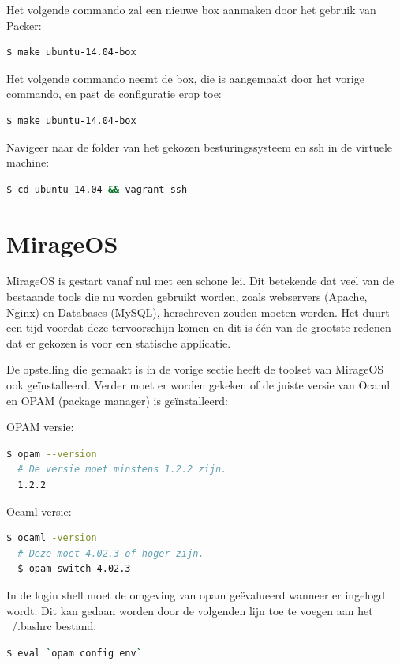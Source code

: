 \documentclass[pdftex,a4paper,12pt,twoside]{report}
\begin{document}
\noindent Het volgende commando zal een nieuwe box aanmaken door het gebruik van Packer:
\begin{lstlisting}[language=bash]
  $ make ubuntu-14.04-box
\end{lstlisting}

\noindent Het volgende commando neemt de box, die is aangemaakt door het vorige commando, en past de configuratie erop toe:
\begin{lstlisting}[language=bash]
  $ make ubuntu-14.04-box
\end{lstlisting}

\noindent Navigeer naar de folder van het gekozen besturingssysteem en ssh in de virtuele machine: 
\begin{lstlisting}[language=bash]
  $ cd ubuntu-14.04 && vagrant ssh
\end{lstlisting}

\section{MirageOS}

MirageOS is gestart vanaf nul met een schone lei. Dit betekende dat veel van de bestaande tools die nu worden gebruikt worden, zoals webservers (Apache, Nginx) en Databases (MySQL), herschreven zouden moeten worden. Het duurt een tijd voordat deze tervoorschijn komen en dit is één van de grootste redenen dat er gekozen is voor een statische applicatie.

De opstelling die gemaakt is in de vorige sectie heeft de toolset van MirageOS ook geïnstalleerd. Verder moet er worden gekeken of de juiste versie van Ocaml en OPAM (package manager) is geïnstalleerd:

\noindent OPAM versie:
\begin{lstlisting}[language=bash]
  $ opam --version
  # De versie moet minstens 1.2.2 zijn.
  1.2.2
\end{lstlisting}

\noindent Ocaml versie:
\begin{lstlisting}[language=bash]
  $ ocaml -version
  # Deze moet 4.02.3 of hoger zijn.
  $ opam switch 4.02.3
\end{lstlisting}

In de login shell moet de omgeving van opam geëvalueerd wanneer er ingelogd wordt. Dit kan gedaan worden door de volgenden lijn toe te voegen aan het ~/.bashrc bestand:

\begin{lstlisting}[language=bash]
  $ eval `opam config env`
\end{lstlisting}
\end{document}
